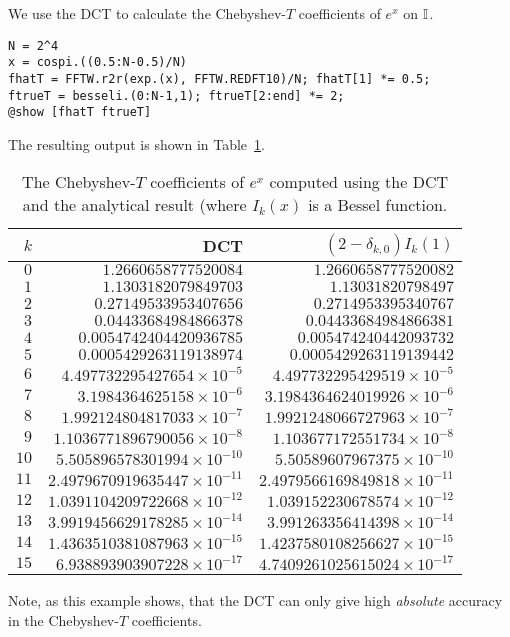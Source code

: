 \begin{example}\label{Example:DCT}
We use the DCT to calculate the Chebyshev-$T$ coefficients of $e^x$ on $\mathbb{I}$.
\begin{verbatim}
N = 2^4
x = cospi.((0.5:N-0.5)/N)
fhatT = FFTW.r2r(exp.(x), FFTW.REDFT10)/N; fhatT[1] *= 0.5;
ftrueT = besseli.(0:N-1,1); ftrueT[2:end] *= 2;
@show [fhatT ftrueT]
\end{verbatim}
The resulting output is shown in Table~\ref{table:ChebyshevTExponential}.
\begin{table}[htdp]
\caption{The Chebyshev-$T$ coefficients of $e^x$ computed using the DCT and the analytical result (where $I_k(x)$ is a Bessel function.}
\begin{center}
\begin{tabular}{rrr}
\hline
$k$ & DCT & $(2-\delta_{k,0})I_k(1)$\\
\hline
$0$ & $1.2660658777520084$ & $1.2660658777520082$\\
$1$ & $1.1303182079849703$ & $1.13031820798497$\\
$2$ & $0.27149533953407656$ & $0.2714953395340767$\\
$3$ & $0.04433684984866378$ & $0.04433684984866381$\\
$4$ & $0.0054742404420936785$ & $0.005474240442093732$\\
$5$ & $0.0005429263119138974$ & $0.0005429263119139442$\\
$6$ & $4.497732295427654\times10^{-5}$ & $4.497732295429519\times10^{-5}$\\
$7$ & $3.1984364625158\times10^{-6}$ & $3.1984364624019926\times10^{-6}$\\
$8$ & $1.992124804817033\times10^{-7}$ & $1.9921248066727963\times10^{-7}$\\
$9$ & $1.1036771896790056\times10^{-8}$ & $1.103677172551734\times10^{-8}$\\
$10$ & $5.505896578301994\times10^{-10}$ & $5.50589607967375\times10^{-10}$\\
$11$ & $2.4979670919635447\times10^{-11}$ & $2.4979566169849818\times10^{-11}$\\
$12$ & $1.0391104209722668\times10^{-12}$ & $1.039152230678574\times10^{-12}$\\
$13$ & $3.9919456629178285\times10^{-14}$ & $3.991263356414398\times10^{-14}$\\
$14$ & $1.4363510381087963\times10^{-15}$ & $1.4237580108256627\times10^{-15}$\\
$15$ & $6.938893903907228\times10^{-17}$ & $4.7409261025615024\times10^{-17}$\\
\hline
\end{tabular}
\end{center}
\label{table:ChebyshevTExponential}
\end{table}%
Note, as this example shows, that the DCT can only give high {\em absolute} accuracy in the Chebyshev-$T$ coefficients.
\end{example}

